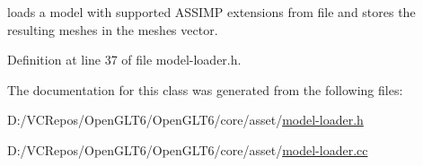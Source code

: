 loads a model with supported A\+S\+S\+I\+MP extensions from file and stores the resulting meshes in the meshes vector. 

Definition at line 37 of file model-\/loader.\+h.



The documentation for this class was generated from the following files\+:\begin{DoxyCompactItemize}
\item 
D\+:/\+V\+C\+Repos/\+Open\+G\+L\+T6/\+Open\+G\+L\+T6/core/asset/\mbox{\hyperlink{model-loader_8h}{model-\/loader.\+h}}\item 
D\+:/\+V\+C\+Repos/\+Open\+G\+L\+T6/\+Open\+G\+L\+T6/core/asset/\mbox{\hyperlink{model-loader_8cc}{model-\/loader.\+cc}}\end{DoxyCompactItemize}
